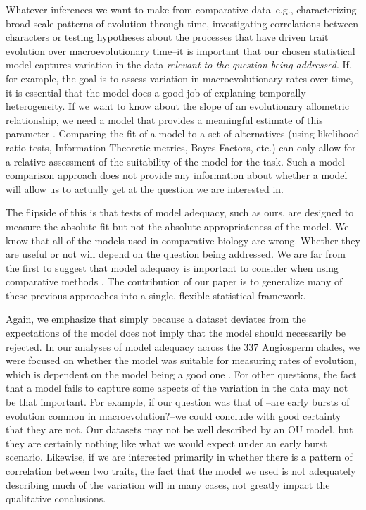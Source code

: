 Whatever inferences we want to make from comparative data--e.g., characterizing broad-scale patterns of evolution through time, investigating correlations between characters or testing hypotheses about the processes that have driven trait evolution over macroevolutionary time--it is important that our chosen statistical model captures variation in the data \emph{relevant to the question being addressed}. If, for example, the goal is to assess variation in macroevolutionary rates over time, it is essential that the model does a good job of explaning temporally heterogeneity. If we want to know about the slope of an evolutionary allometric relationship, we need a model that provides a meaningful estimate of this parameter \citep{Hansen2012SysBio}. Comparing the fit of a model to a set of alternatives (using likelihood ratio tests, Information Theoretic metrics, Bayes Factors, etc.) can only allow for a relative assessment of the suitability of the model for the task. Such a model comparison approach does not provide any information about whether a model will allow us to actually get at the question we are interested in. 

The flipside of this is that tests of model adequacy, such as ours, are designed to measure the absolute fit but not the absolute appropriateness of the model. We know that all of the models used in comparative biology are wrong. Whether they are useful or not will depend on the question being addressed. We are far from the first to suggest that model adequacy is important to consider when using comparative methods \citep[see, for example][]{Felsenstein1985, Felsenstein1988, HarveyPagel1991, Garland1992, Diaz1996, HansenMartins1996, Price1997, Garland1999, GarlandIves2000, HansenOrzack2005, Hansen2012SysBio, Felsenstein2012, Boettiger2012, SlaterPennell, Beaulieu2013, Blackmon2014}. The contribution of our paper is to generalize many of these previous approaches into a single, flexible statistical framework. 

Again, we emphasize that simply because a dataset deviates from the expectations of the model does not imply that the model should necessarily be rejected. In our analyses of model adequacy across the 337 Angiosperm clades, we were focused on whether the model was suitable for measuring rates of evolution, which is dependent on the model being a good one \citep{Hunt2012}. For other questions, the fact that a model fails to capture some aspects of the variation in the data may not be that important. For example, if our question was that of \citet{Harmon2010}--are early bursts of evolution common in macroevolution?--we could conclude with good certainty that they are not. Our datasets may not be well described by an OU model, but they are certainly nothing like what we would expect under an early burst scenario. Likewise, if we are interested primarily in whether there is a pattern of correlation between two traits, the fact that the model we used is not adequately describing much of the variation will in many cases, not greatly impact the qualitative conclusions.

